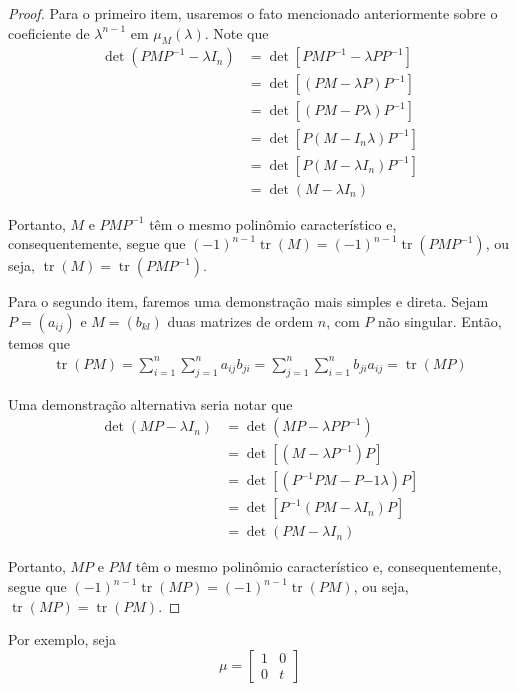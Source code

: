 \documentclass[a4paper,portuguese,11pt,twoside, leqno]{book}
\DeclareMathOperator{\tr}{tr}
\theoremstyle{definition}
\begin{document}
	\begin{proof}
		Para o primeiro item, usaremos o fato mencionado anteriormente sobre o coeficiente de $\lambda^{n-1}$ em $\mu_M(\lambda)$. Note que 
		\begin{align*}
		\det( PMP^{-1} - \lambda I_n ) &= \det[ PMP^{-1} - \lambda PP^{-1} ] \\
		&= \det[ (PM - \lambda P)P^{-1} ] \\
		&= \det[ (PM - P\lambda)P^{-1} ] \\
		&= \det[ P(M - I_n\lambda)P^{-1} ] \\
		&= \det[ P(M - \lambda I_n)P^{-1} ] \\
		&= \det(M - \lambda I_n)
		\end{align*}
		\par\vspace{0.3cm} Portanto, $M$ e $PMP^{-1}$ têm o mesmo polinômio característico e, consequentemente, segue que $(-1)^{n-1}\tr(M) = (-1)^{n-1}\tr(PMP^{-1})$, ou seja, $\tr(M) = \tr(PMP^{-1})$.
		\par\vspace{0.3cm} Para o segundo item, faremos uma demonstração mais simples e direta. Sejam $P = (a_{ij})$ e $M = (b_{kl})$ duas matrizes de ordem $n$, com $P$ não singular. Então, temos que
		\begin{align*}
		\tr(PM) = \sum_{i=1}^{n}\sum_{j=1}^{n} a_{ij}b_{ji} = \sum_{j=1}^{n}\sum_{i=1}^{n} b_{ji}a_{ij} = \tr(MP)
		\end{align*}
		\par\vspace{0.3cm} Uma demonstração alternativa seria notar que
		\begin{align*}
		\det(MP - \lambda I_n) &= \det(MP - \lambda PP^{-1}) \\
		&= \det[ (M - \lambda P^{-1})P ] \\
		&= \det[ (P^{-1}PM - P{-1}\lambda)P ] \\
		&= \det[ P^{-1}(PM - \lambda I_n)P ] \\
		&= \det(PM - \lambda I_n)
		\end{align*}
		\par\vspace{0.3cm} Portanto, $MP$ e $PM$ têm o mesmo polinômio característico e, consequentemente, segue que $(-1)^{n-1}\tr(MP) = (-1)^{n-1}\tr(PM)$, ou seja, $\tr(MP) = \tr(PM)$.
	\end{proof}
	\par\vspace{0.3cm} Por exemplo, seja 
	\begin{equation}
	\label{parte 1 invariante Jones}
	\mu = \begin{bmatrix}
	1 & 0 \\
	0 & t
	\end{bmatrix}
	\end{equation}
\end{document}
